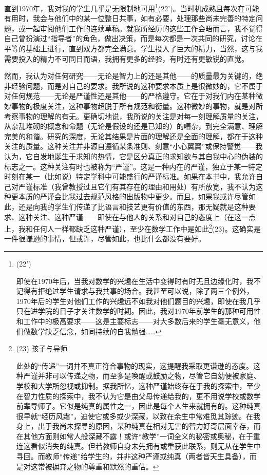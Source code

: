 直到1970年，我对我的学生几乎是无限制地可用\footnote{(22’)\par 即使在1970年后，当我对数学的兴趣在生活中变得时有时无且边缘化时，我不记得有拒绝过学生请求与我共事的场合。我甚至可以说，除了两三个例外，1970年后的学生对他们工作的兴趣远不如我对他们题目的兴趣，即使在我几乎只在进学院的日子才关注数学的时期。因此，我对1970年前学生的那种可用性和工作中的极高要求——这是主要标志——对大多数后来的学生毫无意义，他们做数学缺乏信念，如同持续的自我勉强……}(22’)。当时机成熟且每次在可能有用时，我会与他们中的某一位整日共事，如有必要，处理那些尚未完善的特定问题，或一起审阅他们工作的连续草稿。就我所经历的这些工作会晤而言，我不觉得自己曾扮演过“指导者”的角色，做出决策，而是每次都是一次共同的研究，讨论在平等的基础上进行，直到双方都完全满意。学生投入了巨大的精力，当然，这与我需要投入的精力不可同日而语，我拥有更多的经验，有时还有更敏锐的直觉。

然而，我认为对任何研究——无论是智力上的还是其他——的质量最为关键的，绝非经验问题，而是对自己的要求。我所说的这种要求本质上是很微妙的，它不属于对任何规范——无论是严谨性还是其他——的严格遵守。它在于对我们内在某种微妙事物的极度关注，这种事物超脱于所有规范和衡量。这种微妙的事物，就是对所考察事物的理解的有无。更确切地说，我所说的关注是对每一刻理解质量的关注，从杂乱堆砌的概念和命题（无论是假设的还是已知的）的嘈杂，到完全满意、理解完美的和谐。研究的深度，无论其结果是片面的理解还是全面的理解，都在于这种关注的质量。这种关注并非源自遵循某条准则、刻意“小心翼翼”或保持警觉——我认为，它自发地诞生于求知的热情，它是区分真正的求知欲与其自我中心的伪装的标志之一。这种关注有时也被称为“严谨”。这是一种内在的严谨，独立于某一特定时刻在某一（比如说）特定学科中可能盛行的严谨标准。如果在本书中，我允许自己对严谨标准（我曾教授过且它们有其存在的理由和用处）有所放宽，我不认为这种更本质的严谨会比我过去规范风格的出版物中更少。而且，如果我或许尽管如此，还是向我的学生们传递了比语言和技艺更有价值的东西，那无疑就是这种要求、这种关注、这种严谨——即使在与他人的关系和对自己的态度上（在这一点上，我和任何人一样都缺乏这种严谨），至少在数学工作中是如此\footnote{(23) 孩子与导师 \par 此处的“传递”一词并不真正符合事物的现实，这提醒我采取更谦逊的态度。这种严谨并非可以传递之物，而至多是唤醒或鼓励之物，尽管它自幼便被家庭、学校和大学所忽视或抑制。据我所忆，这种严谨始终存在于我的探索中，至少在智力性质的探索中，我不认为它是由父母传递给我的，更不用说学校或数学前辈导师了。它似是纯真的属性之一，因此是每个人生来就拥有的。这种纯真很早就“经历风霜”，迫使它或多或少深藏，以致在余生中常难觅其踪迹。在我身上，出于我尚未探寻的原因，某种纯真在相对无害的智力好奇层面幸存，而在其他方面则如常人般深藏不露！或许“教学”一词全义的秘密或奥秘，在于重连这看似消失的纯真。但若教师自身未先拥有或重获此联系，则无从在学生中寻回。而教师“传递”给学生的，并非这种严谨或纯真（两者皆天生具备），而是对这常被摒弃之物的尊重和默然的重估。}(23)。这确实是一件很谦逊的事情，但或许，尽管如此，也比什么都没有要好。